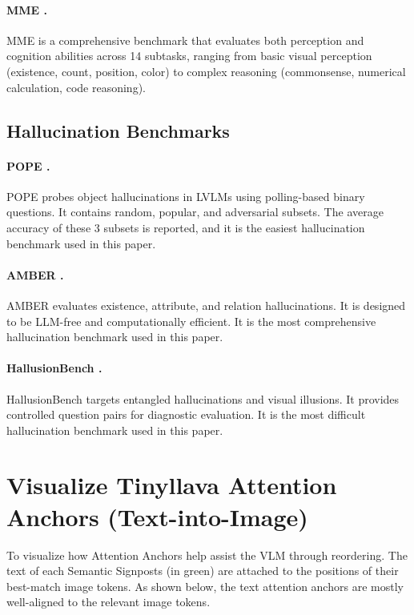 \documentclass[11pt]{article}
\begin{document}
\paragraph{MME \citep{fu2023mme}.}
MME is a comprehensive benchmark that evaluates both perception and cognition abilities across 14 subtasks, ranging from basic visual perception (existence, count, position, color) to complex reasoning (commonsense, numerical calculation, code reasoning).


\subsection{Hallucination Benchmarks}
\paragraph{POPE \citep{li2023evaluating}.}
POPE probes object hallucinations in LVLMs using polling-based binary questions. It contains random, popular, and adversarial subsets. The average accuracy of these 3 subsets is reported, and it is the easiest hallucination benchmark used in this paper.  

\paragraph{AMBER \citep{wang2023amber}.}
AMBER evaluates existence, attribute, and relation hallucinations. It is designed to be LLM-free and computationally efficient. It is the most comprehensive hallucination benchmark used in this paper.

\paragraph{HallusionBench \citep{guan2024hallusionbench}.}
HallusionBench targets entangled hallucinations and visual illusions. It provides controlled question pairs for diagnostic evaluation.  It is the most difficult hallucination benchmark used in this paper.


\section{Visualize Tinyllava Attention Anchors (Text-into-Image)}
\label{app:visualize_text_into_image}

To visualize how Attention Anchors help assist the VLM through reordering. The text of each Semantic Signposts (in green) are attached to the positions of their best-match image tokens. As shown below, the text attention anchors are mostly well-aligned to the relevant image tokens.
\end{document}
